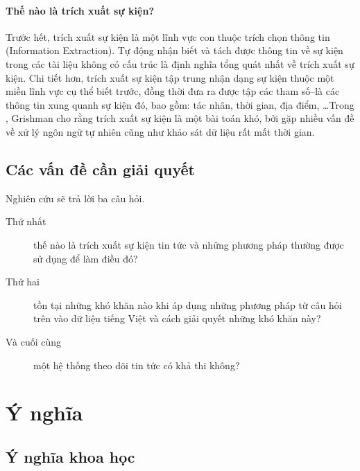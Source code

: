 \paragraph{Thế nào là trích xuất sự kiện?} Trước hết, trích xuất sự kiện là một lĩnh vực con thuộc trích chọn thông tin (Information Extraction). Tự động nhận biết và tách được thông tin về sự kiện trong các tài liệu không có cấu trúc là định nghĩa tổng quát nhất về trích xuất sự kiện. Chi tiết hơn, trích xuất sự kiện tập trung nhận dạng sự kiện thuộc một miền lĩnh vực cụ thể biết trước, đồng thời đưa ra được tập các tham số--là các thông tin xung quanh sự kiện đó, bao gồm: tác nhân, thời gian, địa điểm, \ldots Trong \cite{RG10}, Grishman cho rằng trích xuất sự kiện là một bài toán khó, bởi gặp nhiều vấn đề về xử lý ngôn ngữ tự nhiên cũng như khảo sát dữ liệu rất mất thời gian.


\subsection{Các vấn đề cần giải quyết}
 \noindent Nghiên cứu sẽ trả lời ba câu hỏi.
 \begin{description}
 \item[Thứ nhất] thế nào là trích xuất sự kiện tin tức và những phương pháp thường được sử dụng để làm điều đó?
\item[Thứ hai] tồn tại những khó khăn nào  khi áp dụng những phương pháp từ câu hỏi trên vào dữ liệu tiếng Việt và cách giải quyết những khó khăn này?
\item[Và cuối cùng] một hệ thống theo dõi tin tức có khả thi không?
 \end{description}

\section{Ý nghĩa}
    \label{meaning}
    \subsection{Ý nghĩa khoa học}

